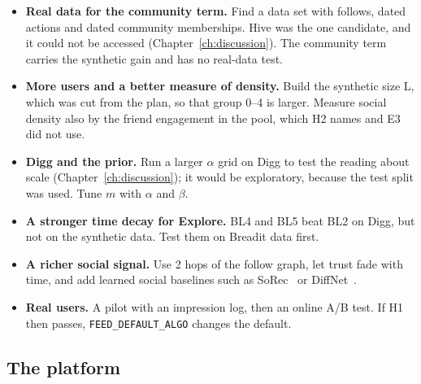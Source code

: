 \begin{itemize}
  \item \textbf{Real data for the community term.} Find a data set with follows, dated actions and dated community memberships. Hive was the one candidate, and it could not be accessed (Chapter~\ref{ch:discussion}). The community term carries the synthetic gain and has no real-data test.
  \item \textbf{More users and a better measure of density.} Build the synthetic size L, which was cut from the plan, so that group 0--4 is larger. Measure social density also by the friend engagement in the pool, which H2 names and E3 did not use.
  \item \textbf{Digg and the prior.} Run a larger $\alpha$ grid on Digg to test the reading about scale (Chapter~\ref{ch:discussion}); it would be exploratory, because the test split was used. Tune $m$ with $\alpha$ and $\beta$.
  \item \textbf{A stronger time decay for Explore.} BL4 and BL5 beat BL2 on Digg, but not on the synthetic data. Test them on Breadit data first.
  \item \textbf{A richer social signal.} Use 2 hops of the follow graph, let trust fade with time, and add learned social baselines such as SoRec~ or DiffNet~.
  \item \textbf{Real users.} A pilot with an impression log, then an online A/B test. If H1 then passes, \texttt{FEED\_DEFAULT\_ALGO} changes the default.
\end{itemize}

\subsection{The platform}

